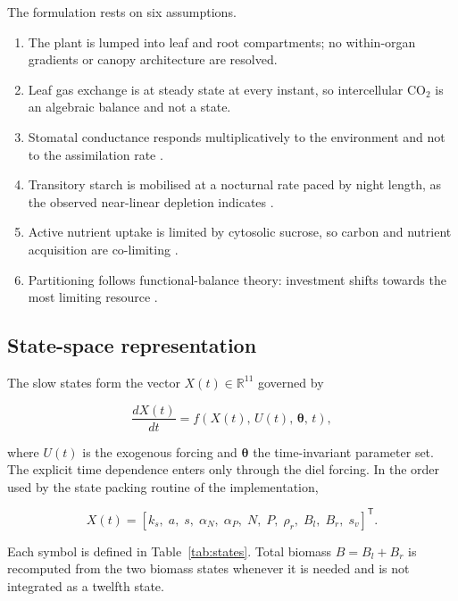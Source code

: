 The formulation rests on six assumptions.
\begin{enumerate}\itemsep1pt
\item[(A1)] The plant is lumped into leaf and root compartments; no within-organ
      gradients or canopy architecture are resolved.
\item[(A2)] Leaf gas exchange is at steady state at every instant, so
      intercellular CO$_2$ is an algebraic balance and not a state.
\item[(A3)] Stomatal conductance responds multiplicatively to the environment and
      not to the assimilation rate \citep{Jarvis1976,Damour2010}.
\item[(A4)] Transitory starch is mobilised at a nocturnal rate paced by night
      length, as the observed near-linear depletion indicates
      \citep{Graf2010,Scialdone2013}.
\item[(A5)] Active nutrient uptake is limited by cytosolic sucrose, so carbon and
      nutrient acquisition are co-limiting \citep{Smith2007}.
\item[(A6)] Partitioning follows functional-balance theory: investment shifts
      towards the most limiting resource
      \citep{Thornley1972,ThornleyJohnson1990}.
\end{enumerate}

\subsection{State-space representation}
\label{sec:state}

The slow states form the vector $X(t)\in\mathbb{R}^{11}$ governed by

\begin{equation}
\frac{dX(t)}{dt} = f\!\left(X(t),\,U(t),\,\boldsymbol{\theta},\,t\right),
\label{eq:ode_general}
\end{equation}

where $U(t)$ is the exogenous forcing and $\boldsymbol{\theta}$ the time-invariant
parameter set. The explicit time dependence enters only through the diel forcing. In
the order used by the state packing routine of the implementation,

\begin{equation}
X(t) =
\left[
k_s,\; a,\; s,\; \alpha_N,\; \alpha_P,\; N,\; P,\; \rho_r,\; B_l,\; B_r,\; s_v
\right]^{\mathsf{T}}.
\label{eq:state_vector}
\end{equation}

Each symbol is defined in Table~\ref{tab:states}. Total biomass $B = B_l + B_r$ is
recomputed from the two biomass states whenever it is needed and is not integrated
as a twelfth state.

